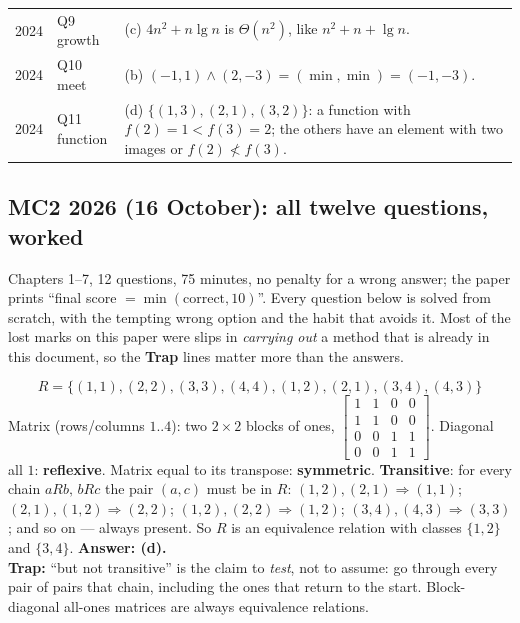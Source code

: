 \documentclass{fkt-notes}
\theoremstyle{definition}
\begin{document}
\begin{center}
\begin{tabular}{@{}llp{}@{}}
    2024  & Q9 growth    & (c) $4n^2+n\lg n$ is $\Theta(n^2)$, like $n^2+n+\lg n$.                                                                                                                                                       \\
    2024  & Q10 meet     & (b) $(-1,1)\wedge(2,-3)=(\min,\min)=(-1,-3)$.                                                                                                                                                                 \\
    2024  & Q11 function & (d) $\{(1,3),(2,1),(3,2)\}$: a function with $f(2)=1<f(3)=2$; the others have an element with two images or $f(2)\not<f(3)$.                                                                                  \\
    \bottomrule
  \end{tabular}
\end{center}

\clearpage
\subsection*{MC2 2026 (16 October): all twelve questions, worked}\label{sec:mc2-2026}
%
Chapters 1--7, 12 questions, 75 minutes, no penalty for a wrong answer; the
paper prints ``final score $=\min(\text{correct},10)$''. Every question
below is solved from scratch, with the tempting wrong option and the habit
that avoids it. Most of the lost marks on this paper were slips in
\emph{carrying out} a method that is already in this document, so the
\textbf{Trap} lines matter more than the answers.

\begin{example}
  \[R=\{(1,1),(2,2),(3,3),(4,4),(1,2),(2,1),(3,4),(4,3)\}\]
  Matrix (rows/columns $1..4$): two $2\times2$ blocks of ones,
  $\begin{bmatrix}1&1&0&0\\1&1&0&0\\0&0&1&1\\0&0&1&1\end{bmatrix}$.
  Diagonal all $1$: \textbf{reflexive}. Matrix equal to its transpose:
  \textbf{symmetric}. \textbf{Transitive}: for every chain $aRb,\,bRc$ the
  pair $(a,c)$ must be in $R$: $(1,2),(2,1)\Rightarrow(1,1)$;
  $(2,1),(1,2)\Rightarrow(2,2)$; $(1,2),(2,2)\Rightarrow(1,2)$;
  $(3,4),(4,3)\Rightarrow(3,3)$; and so on --- always present. So $R$ is an
  equivalence relation with classes $\{1,2\}$ and $\{3,4\}$.
  \textbf{Answer: (d).}\\
  \textbf{Trap:} ``but not transitive'' is the claim to \emph{test}, not to
  assume: go through every pair of pairs that chain, including the ones
  that return to the start. Block-diagonal all-ones matrices are always
  equivalence relations.
\end{example}
\end{document}

